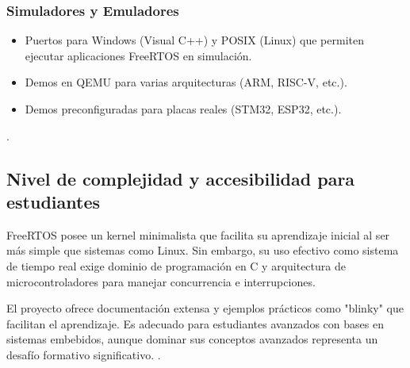 \subsubsection*{Simuladores y Emuladores}
\begin{itemize}
    \item Puertos para Windows (Visual C++) y POSIX (Linux) que permiten ejecutar aplicaciones FreeRTOS en simulación.
    \item Demos en QEMU para varias arquitecturas (ARM, RISC-V, etc.).
    \item Demos preconfiguradas para placas reales (STM32, ESP32, etc.).
\end{itemize}
\citep[pag. 40--41]{aosa-freertos}.

\subsection{Nivel de complejidad y accesibilidad para estudiantes}
FreeRTOS posee un kernel minimalista que facilita su aprendizaje inicial al ser más simple que sistemas como Linux. Sin embargo, su uso efectivo como sistema de tiempo real exige dominio de programación en C y arquitectura de microcontroladores para manejar concurrencia e interrupciones.

El proyecto ofrece documentación extensa y ejemplos prácticos como "blinky" que facilitan el aprendizaje. 
Es adecuado para estudiantes avanzados con bases en sistemas embebidos, aunque dominar sus conceptos 
avanzados representa un desafío formativo significativo. \citep{freertos_teaching}.